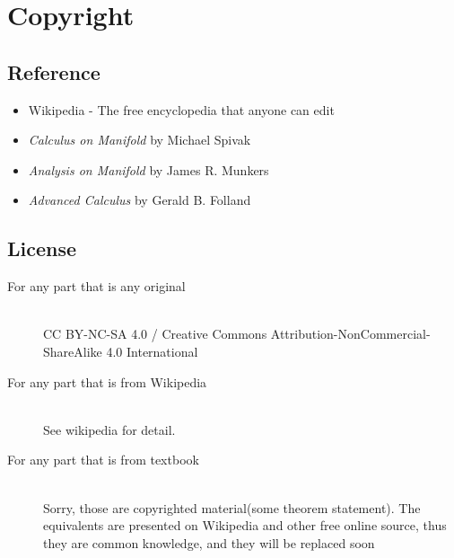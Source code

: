 \section{Copyright}

\subsection{Reference}
\begin{itemize}
\item Wikipedia - The free encyclopedia that anyone can edit
\item \textit{Calculus on Manifold} by Michael Spivak
\item \textit{Analysis on Manifold} by James R. Munkers
\item \textit{Advanced Calculus} by Gerald B. Folland
\end{itemize}

\subsection{License}

\begin{description}
\item[For any part that is any original] \hfill\\
	CC BY-NC-SA 4.0 / Creative Commons Attribution-NonCommercial-ShareAlike 4.0 International
\item[For any part that is from Wikipedia] \hfill\\
	See wikipedia for detail.
\item[For any part that is from textbook] \hfill\\
	Sorry, those are copyrighted material(some theorem statement).\newline
	The equivalents are presented on Wikipedia and other free online source, thus they are common knowledge, and they will be replaced soon
\end{description}

